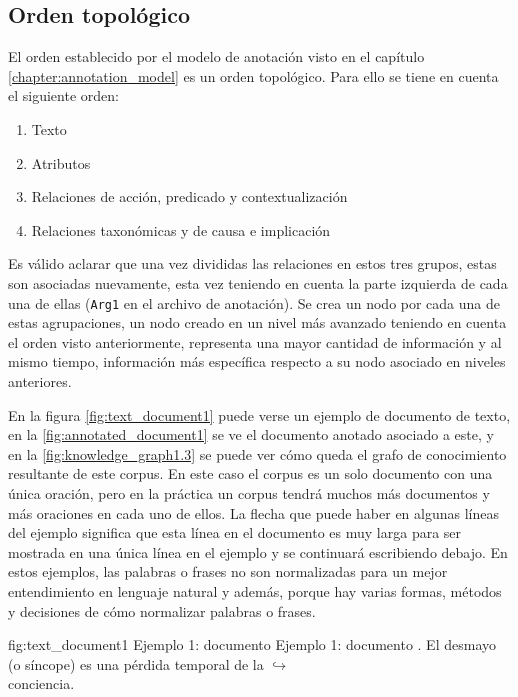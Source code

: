 \subsection{Orden topológico}
El orden establecido por el modelo de anotación visto en el capítulo \ref{chapter:annotation_model} es un orden topológico. Para ello se tiene en cuenta el siguiente orden:

\begin{enumerate}
	\label{enum:knowledge_graph_build_order}
	\item Texto
	\item Atributos
	\item Relaciones de acción, predicado y contextualización
	\item Relaciones taxonómicas y de causa e implicación
\end{enumerate}

Es válido aclarar que una vez divididas las relaciones en estos tres grupos, estas son asociadas nuevamente, esta vez teniendo en cuenta la parte izquierda de cada una de ellas (\texttt{Arg1} en el archivo de anotación). Se crea un nodo por cada una de estas agrupaciones, un nodo creado en un nivel más avanzado teniendo en cuenta el orden visto anteriormente, representa una mayor cantidad de información y al mismo tiempo, información más específica respecto a su nodo asociado en niveles anteriores.

En la figura \ref{fig:text_document1} puede verse un ejemplo de documento de texto, en la \ref{fig:annotated_document1} se ve el documento anotado asociado a este, y en la \ref{fig:knowledge_graph1.3} se puede ver cómo queda el grafo de conocimiento resultante de este corpus. En este caso el corpus es un solo documento con una única oración, pero en la práctica un corpus tendrá muchos más documentos y más oraciones en cada uno de ellos. La flecha que puede haber en algunas líneas del ejemplo significa que esta línea en el documento es muy larga para ser mostrada en una única línea en el ejemplo y se continuará escribiendo debajo. En estos ejemplos, las palabras o frases no son normalizadas para un mejor entendimiento en lenguaje natural y además, porque hay varias formas, métodos y decisiones de cómo normalizar palabras o frases.
\begin{annexample}
[backgroundcolor=black!5]
{\textwidth}
{fig:text_document1}
{Ejemplo 1: documento }
{Ejemplo 1: documento .}
	El desmayo (o síncope) es una pérdida temporal de la {\scriptsize $\hookrightarrow$}\\
	conciencia.
\end{annexample}


